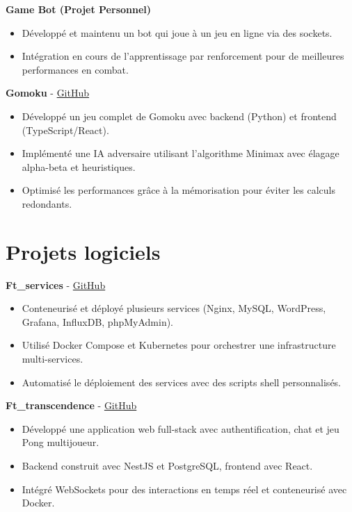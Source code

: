 \documentclass[a4paper,11pt]{article}%
\begin{document}
\noindent \textbf{Game Bot (Projet Personnel)}%
\begin{itemize}[leftmargin=2em,label={},parsep=0pt,topsep=1em]%
\item D\'evelopp\'e et maintenu un bot qui joue \`a un jeu en ligne via des sockets.%
\item Int\'egration en cours de l'apprentissage par renforcement pour de meilleures performances en combat.%
\end{itemize}%
%
\noindent \textbf{Gomoku} - \href{https://github.com/sboof911/Gomoku}{GitHub}%
\begin{itemize}[leftmargin=2em,label={},parsep=0pt,topsep=1em]%
\item D\'evelopp\'e un jeu complet de Gomoku avec backend (Python) et frontend (TypeScript/React).%
\item Impl\'ement\'e une IA adversaire utilisant l'algorithme Minimax avec \'elagage alpha-beta et heuristiques.%
\item Optimis\'e les performances gr\^ace \`a la m\'emorisation pour \'eviter les calculs redondants.%
\end{itemize}%
\section*{Projets logiciels}%
%
\noindent \textbf{Ft\_services} - \href{https://github.com/sboof911/ft_services}{GitHub}%
\begin{itemize}[leftmargin=2em,label={},parsep=0pt,topsep=1em]%
\item Conteneuris\'e et d\'eploy\'e plusieurs services (Nginx, MySQL, WordPress, Grafana, InfluxDB, phpMyAdmin).%
\item Utilis\'e Docker Compose et Kubernetes pour orchestrer une infrastructure multi-services.%
\item Automatis\'e le d\'eploiement des services avec des scripts shell personnalis\'es.%
\end{itemize}%
%
\noindent \textbf{Ft\_transcendence} - \href{https://github.com/sboof911/ft_transcendence}{GitHub}%
\begin{itemize}[leftmargin=2em,label={},parsep=0pt,topsep=1em]%
\item D\'evelopp\'e une application web full-stack avec authentification, chat et jeu Pong multijoueur.%
\item Backend construit avec NestJS et PostgreSQL, frontend avec React.%
\item Int\'egr\'e WebSockets pour des interactions en temps r\'eel et conteneuris\'e avec Docker.%
\end{itemize}%
\end{document}
